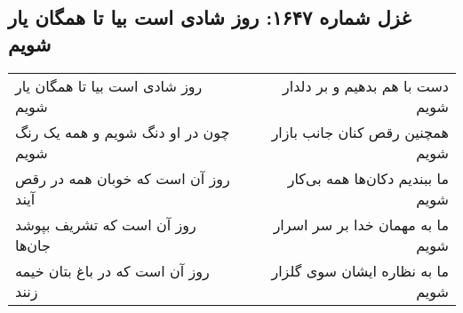 \begin{center}
\section*{غزل شماره ۱۶۴۷: روز شادی است بیا تا همگان یار شویم}
\label{sec:1647}
\begin{longtable}{l p{0.5cm} r}
روز شادی است بیا تا همگان یار شویم
&&
دست با هم بدهیم و بر دلدار شویم
\\
چون در او دنگ شویم و همه یک رنگ شویم
&&
همچنین رقص کنان جانب بازار شویم
\\
روز آن است که خوبان همه در رقص آیند
&&
ما ببندیم دکان‌ها همه بی‌کار شویم
\\
روز آن است که تشریف بپوشد جان‌ها
&&
ما به مهمان خدا بر سر اسرار شویم
\\
روز آن است که در باغ بتان خیمه زنند
&&
ما به نظاره ایشان سوی گلزار شویم
\\
\end{longtable}
\end{center}
